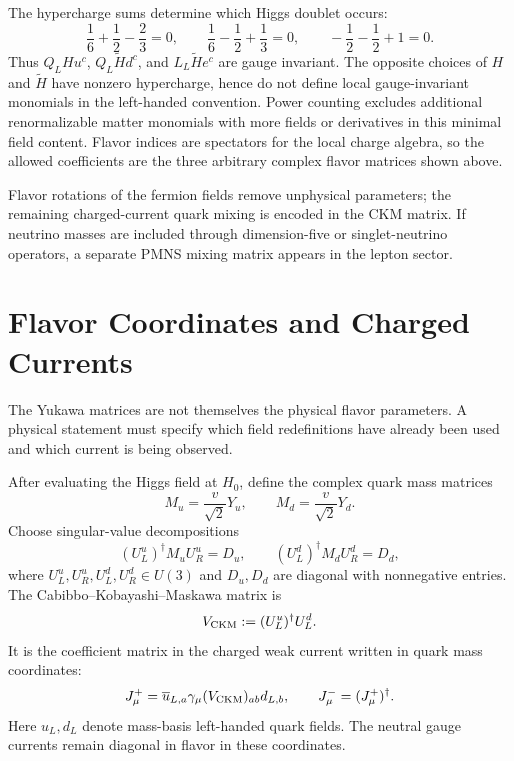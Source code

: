 The hypercharge sums determine which Higgs doublet occurs:
\[
  \frac16+\frac12-\frac23=0,\qquad
  \frac16-\frac12+\frac13=0,\qquad
  -\frac12-\frac12+1=0 .
\]
Thus \(Q_LHu^c\), \(Q_L\widetilde H d^c\), and
\(L_L\widetilde H e^c\) are gauge invariant.  The opposite choices of
\(H\) and \(\widetilde H\) have nonzero hypercharge, hence do not define
local gauge-invariant monomials in the left-handed convention.  Power
counting excludes additional renormalizable matter monomials with more fields
or derivatives in this minimal field content.  Flavor indices are spectators
for the local charge algebra, so the allowed coefficients are the three
arbitrary complex flavor matrices shown above.

Flavor rotations of the fermion fields remove unphysical parameters; the
remaining charged-current quark mixing is encoded in the CKM matrix.  If
neutrino masses are included through dimension-five or singlet-neutrino
operators, a separate PMNS mixing matrix appears in the lepton sector.

\section{Flavor Coordinates and Charged Currents}

The Yukawa matrices are not themselves the physical flavor parameters.  A
physical statement must specify which field redefinitions have already been
used and which current is being observed.

\begin{definition}
\label{def:sm-ckm-matrix}
After evaluating the Higgs field at \(H_0\), define the complex quark mass
matrices
\[
  M_u=\frac{v}{\sqrt2}Y_u,\qquad
  M_d=\frac{v}{\sqrt2}Y_d .
\]
Choose singular-value decompositions
\begin{equation}
  (U_L^u)^\dagger M_uU_R^u=D_u,\qquad
  (U_L^d)^\dagger M_dU_R^d=D_d ,
  \label{eq:sm-quark-svd}
\end{equation}
where \(U_L^u,U_R^u,U_L^d,U_R^d\in U(3)\) and \(D_u,D_d\) are diagonal with
nonnegative entries.  The Cabibbo--Kobayashi--Maskawa matrix is
\begin{equation}
  V_{\rm CKM}:=(U_L^u)^\dagger U_L^d .
  \label{eq:sm-ckm-definition}
\end{equation}
It is the coefficient matrix in the charged weak current written in quark
mass coordinates:
\[
  J_\mu^+
  =
  \overline u_{L,a}\gamma_\mu
  (V_{\rm CKM})_{ab}d_{L,b},
  \qquad
  J_\mu^-=(J_\mu^+)^\dagger .
\]
Here \(u_L,d_L\) denote mass-basis left-handed quark fields.  The neutral
gauge currents remain diagonal in flavor in these coordinates.
\end{definition}

